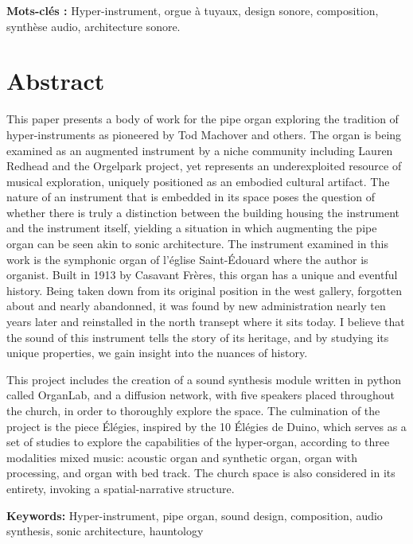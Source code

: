 \documentclass[12pt,twoside,maitrise]{dms_ks}
\theoremstyle{definition}
\begin{document}
\textbf{Mots-clés :} Hyper-instrument, orgue à tuyaux, design sonore, composition, synthèse audio, architecture sonore.


\anglais

\chapter*{Abstract}

This paper presents a body of work for the pipe organ exploring the tradition of hyper-instruments as pioneered by Tod Machover and others. 
The organ is being examined as an augmented instrument by a niche community including Lauren Redhead and the Orgelpark project, yet represents an underexploited resource of musical exploration, uniquely positioned as an embodied cultural artifact. 
The nature of an instrument that is embedded in its space poses the question of whether there is truly a distinction between the building housing the instrument and the instrument itself, yielding a situation in which augmenting the pipe organ can be seen akin to sonic architecture. 
The instrument examined in this work is the symphonic organ of l'église Saint-Édouard where the author is organist. 
Built in 1913 by Casavant Frères, this organ has a unique and eventful history. 
Being taken down from its original position in the west gallery, forgotten about and nearly abandonned, it was found by new administration nearly ten years later and reinstalled in the north transept where it sits today. 
I believe that the sound of this instrument tells the story of its heritage, and by studying its unique properties, we gain insight into the nuances of history. 

This project includes the creation of a sound synthesis module written in python called OrganLab, and a diffusion network, with five speakers placed throughout the church, in order to thoroughly explore the space. 
The culmination of the project is the piece Élégies, inspired by the 10 Élégies de Duino, which serves as a set of studies to explore the capabilities of the hyper-organ, according to three modalities mixed music: acoustic organ and synthetic organ, organ with processing, and organ with bed track. 
The church space is also considered in its entirety, invoking a spatial-narrative structure. 

\textbf{Keywords:} Hyper-instrument, pipe organ, sound design, composition, audio synthesis, sonic architecture, hauntology
\end{document}

